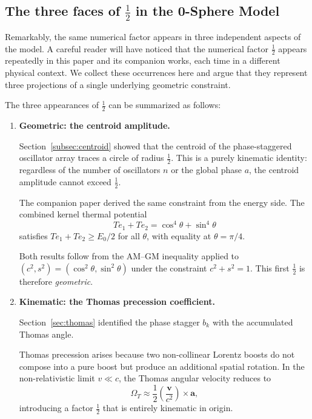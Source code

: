 \documentclass[%
 reprint, amsmath,amssymb, aps, prb, ]{revtex4-2}
\numberwithin{equation}{section}
\newcommand{\iphase}{\theta}
\begin{document}
\subsection{The three faces of $\tfrac{1}{2}$ in the 0-Sphere Model}
\label{subsec:three_halves}

Remarkably, the same numerical factor appears in three independent aspects of the model. A careful reader will have noticed that the numerical factor $\tfrac{1}{2}$ appears repeatedly in this paper and its companion works, each time in a different physical context. We collect these occurrences here and argue that they represent three projections of a single underlying geometric constraint.

\medskip
\noindent
The three appearances of $\tfrac{1}{2}$ can be summarized as follows:

\begin{enumerate}

\item \textbf{Geometric: the centroid amplitude.}

Section~\ref{subsec:centroid} showed that the centroid of the phase-staggered oscillator array traces a circle of radius $\tfrac{1}{2}$. This is a purely kinematic identity: regardless of the number of oscillators $n$ or the global phase $a$, the centroid amplitude cannot exceed $\tfrac{1}{2}$.

The companion paper \cite{hanamura46} derived the same constraint from the energy side. The combined kernel thermal potential
\[
Te_1 + Te_2 = \cos^4\iphase + \sin^4\iphase
\]
satisfies $Te_1 + Te_2 \ge E_0/2$ for all $\iphase$, with equality at $\iphase=\pi/4$.

Both results follow from the AM--GM inequality applied to $(c^2,s^2)=(\cos^2\iphase,\sin^2\iphase)$ under the constraint $c^2+s^2=1$. This first $\tfrac{1}{2}$ is therefore \emph{geometric}.

\item \textbf{Kinematic: the Thomas precession coefficient.}

Section~\ref{sec:thomas} identified the phase stagger $b_k$ with the accumulated Thomas angle.

Thomas precession arises because two non-collinear Lorentz boosts do not compose into a pure boost but produce an additional spatial rotation. In the non-relativistic limit $v\ll c$, the Thomas angular velocity reduces to
\[
\Omega_T \approx \frac{1}{2}\left(\frac{\mathbf v}{c^2}\right) \times \mathbf a ,
\]
introducing a factor $\tfrac{1}{2}$ that is entirely kinematic in origin.


\end{enumerate}
\end{document}
